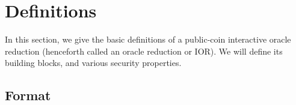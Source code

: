 

\section{Definitions}\label{sec:oracle_reductions_defs}

In this section, we give the basic definitions of a public-coin interactive oracle reduction
(henceforth called an oracle reduction or IOR). We will define its building blocks, and various
security properties.

\subsection{Format}\label{sec:oracle_reductions_defs_format}

